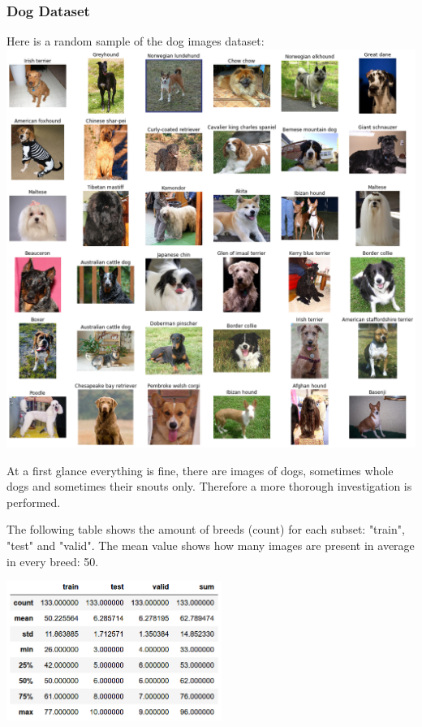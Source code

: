 \documentclass[paper=A4, DIV=10, parskip=half]{scrartcl}
\begin{document}
\subsubsection*{Dog Dataset}

Here is a random sample of the dog images dataset:\\
\includegraphics[width=\textwidth]{images/dog_sample.png}

At a first glance everything is fine, there are images of dogs, sometimes whole
dogs and sometimes their snouts only. Therefore a more thorough investigation is
performed.

The following table shows the amount of breeds (count) for each subset: "train",
"test" and "valid". The mean value shows how many images are present in average
in every breed: 50.

\begin{center}
\includegraphics[width=7cm]{images/dog_deviation.png}
\end{center}
\end{document}
